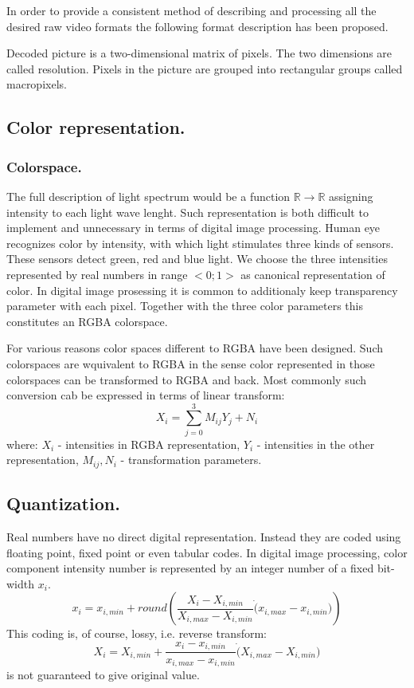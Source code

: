 In order to provide a consistent method of describing and processing all the desired raw video formats the following format description has been proposed.

Decoded picture is a two-dimensional matrix of pixels. The two dimensions are called resolution. Pixels in the picture are grouped into rectangular groups called macropixels.

\subsection{Color representation.}

\subsubsection{Colorspace.}

The full description of light spectrum would be a function $\mathbb{R} \to \mathbb{R}$ assigning intensity to each light wave lenght. Such representation is both difficult to implement and unnecessary in terms of digital image processing. Human eye recognizes color by intensity, with which light stimulates three kinds of sensors. These sensors detect green, red and blue light. We choose the three intensities represented by real numbers in range $<0; 1>$ as canonical representation of color. In digital image prosessing it is common to additionaly keep transparency parameter with each pixel. Together with the three color parameters this constitutes an RGBA colorspace.

For various reasons color spaces different to RGBA have been designed. Such colorspaces are wquivalent to RGBA in the sense color represented in those colorspaces can be transformed to RGBA and back. Most commonly such conversion cab be expressed in terms of linear transform:
\begin{equation}
X_i = \sum^3_{j=0} M_{ij} Y_j + N_i
\end{equation}
where: $X_i$ - intensities in RGBA representation, $Y_i$ - intensities in the other representation, $M_{ij}, N_{i}$ - transformation parameters.

\subsection{Quantization.}

Real numbers have no direct digital representation. Instead they are coded using floating point, fixed point or even tabular codes. In digital image processing, color component intensity number is represented by an integer number of a fixed bit-width $x_i$.
\begin{equation}
x_i = x_{i,min} + round \left( \frac{X_i - X_{i,min}}{X_{i,max} - X_{i,min}} \dot (x_{i,max} - x_{i,min}) \right)
\end{equation}
This coding is, of course, lossy, i.e. reverse transform:
\begin{equation}
X_i = X_{i,min} + \frac{x_i - x_{i,min}}{x_{i,max} - x_{i,min}} \dot (X_{i,max} - X_{i,min})
\end{equation}
is not guaranteed to give original value.

